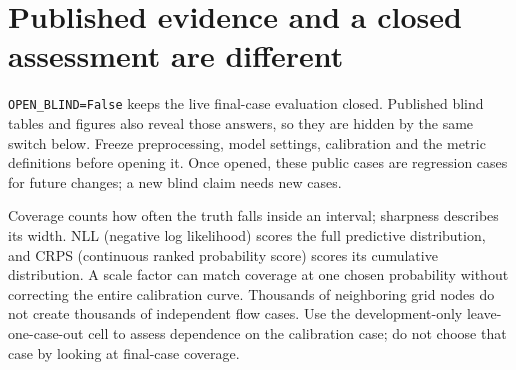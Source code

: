 \section*{Published evidence and a closed assessment are different}
\texttt{OPEN\_BLIND=False} keeps the live final-case evaluation closed. Published blind
tables and figures also reveal those answers, so they are hidden by the same
switch below. Freeze preprocessing, model settings, calibration and the metric
definitions before opening it. Once opened, these public cases are regression
cases for future changes; a new blind claim needs new cases.

Coverage counts how often the truth falls inside an interval; sharpness describes
its width. NLL (negative log likelihood) scores the full predictive distribution,
and CRPS (continuous ranked probability score) scores its cumulative distribution.
A scale factor can match coverage at one chosen probability without correcting
the entire calibration curve. Thousands of neighboring grid nodes do not create
thousands of independent flow cases. Use the development-only leave-one-case-out
cell to assess dependence on the calibration case; do not choose that case by
looking at final-case coverage.
